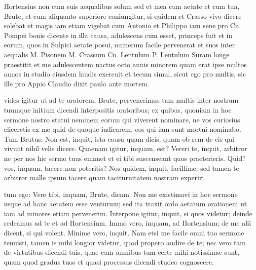  Hortensius non cum suis aequalibus solum sed et mea cum aetate et cum tua, Brute, et cum aliquanto superiore coniungitur, si quidem et Crasso vivo dicere solebat et magis iam etiam vigebat cum Antonio et Philippo iam sene pro Cn. Pompei bonis dicente in illa causa, adulescens cum esset, princeps fuit et in eorum, quos in Sulpici aetate posui, numerum facile pervenerat et suos inter aequalis M. Pisonem M. Crassum Cn. Lentulum P. Lentulum Suram longe praestitit et me adulescentem nactus octo annis minorem quam erat ipse multos annos in studio eiusdem laudis exercuit et tecum simul, sicut ego pro multis, sic ille pro Appio Claudio dixit paulo ante mortem.

 vides igitur ut ad te oratorem, Brute, pervenerimus tam multis inter nostrum tuumque initium dicendi interpositis oratoribus; ex quibus, quoniam in hoc sermone nostro statui neminem eorum qui viverent nominare, ne vos curiosius eliceretis ex me quid de quoque iudicarem, eos qui iam sunt mortui nominabo. Tum Brutus: Non est, inquit, ista causa quam dicis, quam ob rem de eis qui vivunt nihil velis dicere. Quaenam igitur, inquam, est? Vereri te, inquit, arbitror ne per nos hic sermo tuus emanet et ei tibi suscenseant quos praeterieris. Quid? vos, inquam, tacere non poteritis? Nos quidem, inquit, facillime; sed tamen te arbitror malle ipsum tacere quam taciturnitatem nostram experiri.

 tum ego: Vere tibi, inquam, Brute, dicam. Non me existimavi in hoc sermone usque ad hanc aetatem esse venturum; sed ita traxit ordo aetatum orationem ut iam ad minores etiam pervenerim. Interpone igitur, inquit, si quos videtur; deinde redeamus ad te et ad Hortensium. Immo vero, inquam, ad Hortensium; de me alii dicent, si qui volent. Minime vero, inquit. Nam etsi me facile omni tuo sermone tenuisti, tamen is mihi longior videtur, quod propero audire de te; nec vero tam de virtutibus dicendi tuis, quae cum omnibus tum certe mihi notissimae sunt, quam quod gradus tuos et quasi processus dicendi studeo cognoscere.


